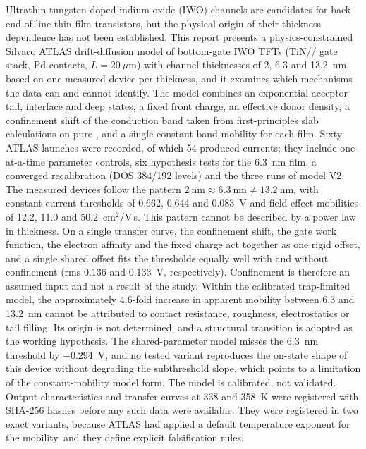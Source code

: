 Ultrathin tungsten-doped indium oxide (IWO) channels are candidates for back-end-of-line thin-film transistors, but the physical origin of their thickness dependence has not been established. This report presents a physics-constrained Silvaco ATLAS drift-diffusion model of bottom-gate IWO TFTs (TiN/\HfO/\AlO{} gate stack, Pd contacts, $L = 20~\mu$m) with channel thicknesses of 2, 6.3 and 13.2~nm, based on one measured device per thickness, and it examines which mechanisms the data can and cannot identify. The model combines an exponential acceptor tail, interface and deep states, a fixed front charge, an effective donor density, a confinement shift of the conduction band taken from first-principles slab calculations on pure \InO, and a single constant band mobility for each film. Sixty ATLAS launches were recorded, of which 54 produced currents; they include one-at-a-time parameter controls, six hypothesis tests for the 6.3~nm film, a converged recalibration (DOS 384/192 levels) and the three runs of model V2. The measured devices follow the pattern $2~\mathrm{nm}\approx6.3~\mathrm{nm}\neq13.2~\mathrm{nm}$, with constant-current thresholds of 0.662, 0.644 and 0.083~V and field-effect mobilities of 12.2, 11.0 and 50.2~cm$^2$/V\,s. This pattern cannot be described by a power law in thickness. On a single transfer curve, the confinement shift, the gate work function, the electron affinity and the fixed charge act together as one rigid offset, and a single shared offset fits the thresholds equally well with and without confinement (rms 0.136 and 0.133~V, respectively). Confinement is therefore an assumed input and not a result of the study. Within the calibrated trap-limited model, the approximately 4.6-fold increase in apparent mobility between 6.3 and 13.2~nm cannot be attributed to contact resistance, roughness, electrostatics or tail filling. Its origin is not determined, and a structural transition is adopted as the working hypothesis. The shared-parameter model misses the 6.3~nm threshold by $-0.294$~V, and no tested variant reproduces the on-state shape of this device without degrading the subthreshold slope, which points to a limitation of the constant-mobility model form. The model is calibrated, not validated. Output characteristics and transfer curves at 338 and 358~K were registered with SHA-256 hashes before any such data were available. They were registered in two exact variants, because ATLAS had applied a default temperature exponent for the mobility, and they define explicit falsification rules.

